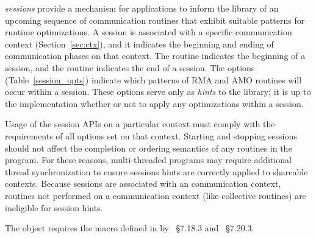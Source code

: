 \openshmem \emph{sessions} provide a mechanism for applications to inform the
\openshmem library of an upcoming sequence of communication routines that
exhibit suitable patterns for runtime optimizations.
A session is associated with a specific \openshmem communication context
(Section~\ref{sec:ctx}), and it indicates the beginning and ending of
communication phases on that context.
The  routine indicates the beginning of a session,
and the  routine indicates the end of a session.
The  options (Table~\ref{session_opts}) indicate
which patterns of \openshmem RMA and AMO routines will occur within a session.
These options serve only as \textit{hints} to the library; it is up to the
implementation whether or not to apply any optimizations within a session.

Usage of the \openshmem session APIs on a particular context must comply with
the requirements of all options set on that context.
Starting and stopping \openshmem sessions should not affect the completion or
ordering semantics of any \openshmem routines in the program.
For these reasons, multi-threaded \openshmem programs may require additional
thread synchronization to ensure sessions hints are correctly applied to
shareable contexts.
Because sessions are associated with an \openshmem communication context,
routines not performed on a communication context (like collective routines)
are ineligible for session hints.

The  object requires the  macro
defined in  by \Cstd[99]~\S7.18.3 and \Cstd[11]~\S7.20.3.
